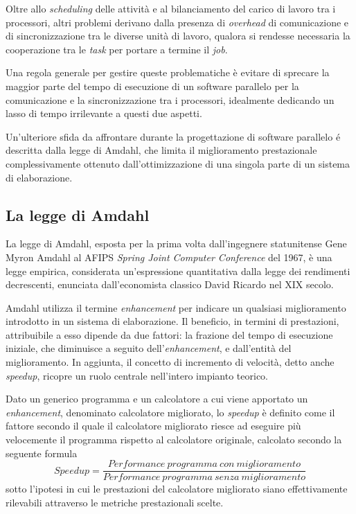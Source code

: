 Oltre allo \textit{scheduling} delle attivit\`a e al bilanciamento del carico di lavoro tra i processori, altri problemi derivano dalla presenza di
\textit{overhead} di comunicazione e di sincronizzazione tra le diverse unit\`a di lavoro, qualora si rendesse necessaria la cooperazione tra le
\textit{task} per portare a termine il \textit{job}.

Una regola generale per gestire queste problematiche \`e evitare di sprecare la maggior parte del tempo di esecuzione di un software parallelo
per la comunicazione e la sincronizzazione tra i processori, idealmente dedicando un lasso di tempo irrilevante a questi due aspetti.

Un'ulteriore sfida da affrontare durante la progettazione di software parallelo \'e descritta dalla legge di
Amdahl, che limita il miglioramento prestazionale complessivamente ottenuto dall'ottimizzazione di una singola parte di un sistema di
elaborazione.
\subsection{La legge di Amdahl}
La legge di Amdahl, esposta per la prima volta dall’ingegnere statunitense Gene Myron Amdahl al AFIPS \textit{Spring Joint Computer
    Conference} del 1967, è una legge empirica, considerata un'espressione quantitativa dalla legge dei rendimenti decrescenti,
enunciata dall’economista classico David Ricardo nel XIX secolo.

Amdahl utilizza il termine \textit{enhancement} per indicare un qualsiasi miglioramento introdotto in un sistema di
elaborazione.\newline
Il beneficio, in termini di prestazioni, attribuibile a esso dipende da due fattori: la frazione del tempo di esecuzione iniziale,
che diminuisce a seguito dell'\textit{enhancement}, e dall'entità del miglioramento.\newline
In aggiunta, il concetto di incremento di velocità, detto anche \textit{speedup}, ricopre un ruolo centrale nell'intero impianto teorico.

Dato un generico programma e un calcolatore a cui viene apportato un \textit{enhancement}, denominato calcolatore migliorato,
lo \textit{speedup} è definito come il fattore secondo il quale il calcolatore migliorato riesce ad eseguire più
velocemente il programma rispetto al calcolatore originale, calcolato secondo la seguente formula
\[
    Speedup=\frac{Performance\ programma\ con\ miglioramento}{Performance\ programma\ senza\ miglioramento}
\]
sotto l’ipotesi in cui le prestazioni del calcolatore migliorato siano effettivamente rilevabili attraverso le metriche
prestazionali
scelte.

